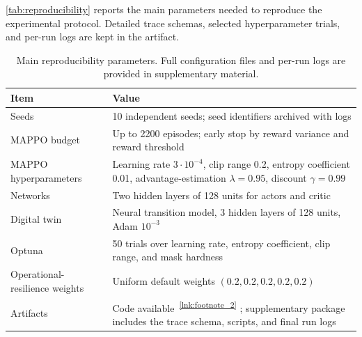 \documentclass[journal]{IEEEtran}
\begin{document}
\autoref{tab:reproducibility} reports the main parameters needed to reproduce the experimental protocol. Detailed trace schemas, selected hyperparameter trials, and per-run logs are kept in the artifact.

\begin{table}[t]
  \centering
  \caption{Main reproducibility parameters. Full configuration files and per-run logs are provided in supplementary material.}
  \label{tab:reproducibility}
  \scriptsize
  \setlength{\tabcolsep}{3pt}
  \begin{tabularx}{\columnwidth}{lX}
    \toprule
    \textbf{Item}                  & \textbf{Value}                                                                                                                       \\
    \midrule
    Seeds                          & 10 independent seeds; seed identifiers archived with logs                                                                            \\
    MAPPO budget                   & Up to 2200 episodes; early stop by reward variance and reward threshold                                                              \\
    MAPPO hyperparameters          & Learning rate $3\cdot10^{-4}$, clip range 0.2, entropy coefficient 0.01, advantage-estimation $\lambda=0.95$, discount $\gamma=0.99$ \\
    Networks                       & Two hidden layers of 128 units for actors and critic                                                                                 \\
    Digital twin                   & Neural transition model, 3 hidden layers of 128 units, Adam $10^{-3}$                                                                \\
    Optuna                         & 50 trials over learning rate, entropy coefficient, clip range, and mask hardness                                                     \\
    Operational-resilience weights & Uniform default weights $(0.2,0.2,0.2,0.2,0.2)$                                                                                      \\
    Artifacts                      & Code available~\textsuperscript{\ref{lnk:footnote_2}} ; supplementary package includes the trace schema, scripts, and final run logs \\
    \bottomrule
  \end{tabularx}
\end{table}
\end{document}
